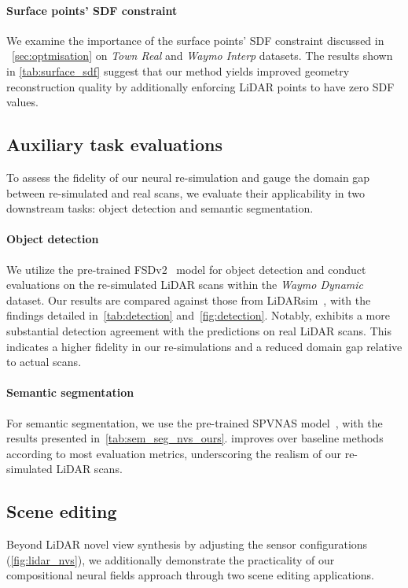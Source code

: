 \paragraph{Surface points' SDF constraint}
We examine the importance of the surface points' SDF constraint discussed in ~\cref{sec:optmisation} on \textit{Town Real} and \textit{Waymo Interp} datasets. The results shown in \cref{tab:surface_sdf} suggest that our method yields improved geometry reconstruction quality by additionally enforcing LiDAR points to have zero SDF values. 


\subsection{Auxiliary task evaluations} 
\label{sec:downstream}
To assess the fidelity of our neural re-simulation and gauge the domain gap between re-simulated and real scans, we evaluate their applicability in two downstream tasks: object detection and semantic segmentation.


\paragraph{Object detection}
We utilize the pre-trained FSDv2~\cite{fan2023fsdv2} model for object detection and conduct evaluations on the re-simulated LiDAR scans within the \textit{Waymo Dynamic} dataset. Our results are compared against those from LiDARsim~\cite{manivasagam2020lidarsim}, with the findings detailed in~\cref{tab:detection} and~\cref{fig:detection}. Notably, \dynfl exhibits a more substantial detection agreement with the predictions on real LiDAR scans. This indicates a higher fidelity in our re-simulations and a reduced domain gap relative to actual scans.


\paragraph{Semantic segmentation}
For semantic segmentation, we use the pre-trained SPVNAS model~\cite{tang2020searching}, with the results presented in~\cref{tab:sem_seg_nvs_ours}. \dynfl improves over baseline methods according to most evaluation metrics, underscoring the realism of our re-simulated LiDAR scans.



\subsection{Scene editing}
Beyond LiDAR novel view synthesis by adjusting the sensor configurations (\cf \cref{fig:lidar_nvs}), we additionally demonstrate the practicality of our compositional neural fields approach through two scene editing applications.

